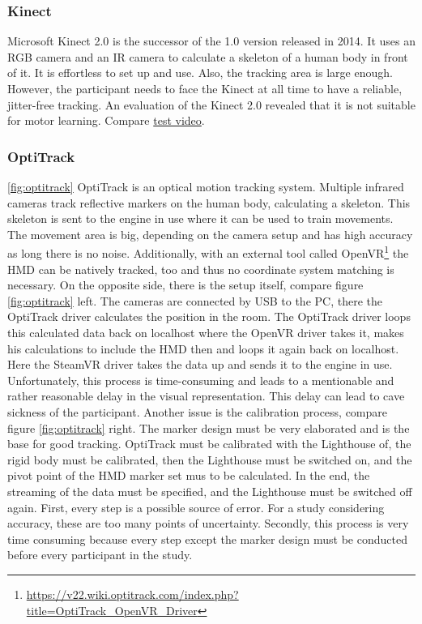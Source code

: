 \subsubsection{Kinect}
Microsoft Kinect 2.0 is the successor of the 1.0 version released in 2014. It uses an RGB camera and an IR camera to calculate a skeleton of a human body in front of it. It is effortless to set up and use. Also, the tracking area is large enough. However, the participant needs to face the Kinect at all time to have a reliable, jitter-free tracking. An evaluation of the Kinect 2.0 revealed that it is not suitable for motor learning. Compare \href{https://youtu.be/3ftKXTBCN0Y}{test video}.


\subsubsection{OptiTrack}
\ref{fig:optitrack} OptiTrack is an optical motion tracking system. Multiple infrared cameras track reflective markers on the human body, calculating a skeleton. This skeleton is sent to the engine in use where it can be used to train movements. The movement area is big, depending on the camera setup and has high accuracy as long there is no noise. Additionally, with an external tool called OpenVR\footnote{\href{https://v22.wiki.optitrack.com/index.php?title=OptiTrack\_OpenVR\_Driver}{https://v22.wiki.optitrack.com/index.php?title=OptiTrack\_OpenVR\_Driver}} the HMD can be natively tracked, too and thus no coordinate system matching is necessary. On the opposite side, there is the setup itself, compare figure \ref{fig:optitrack} left. The cameras are connected by USB to the PC, there the OptiTrack driver calculates the position in the room. The OptiTrack driver loops this calculated data back on localhost where the OpenVR driver takes it, makes his calculations to include the HMD then and loops it again back on localhost. Here the SteamVR driver takes the data up and sends it to the engine in use. Unfortunately, this process is time-consuming and leads to a mentionable and rather reasonable delay in the visual representation. This delay can lead to cave sickness of the participant. Another issue is the calibration process, compare figure \ref{fig:optitrack} right. The marker design must be very elaborated and is the base for good tracking. OptiTrack must be calibrated with the Lighthouse of, the rigid body must be calibrated, then the Lighthouse must be switched on, and the pivot point of the HMD marker set mus to be calculated. In the end, the streaming of the data must be specified, and the Lighthouse must be switched off again. First, every step is a possible source of error. For a study considering accuracy, these are too many points of uncertainty. Secondly, this process is very time consuming because every step except the marker design must be conducted before every participant in the study.
